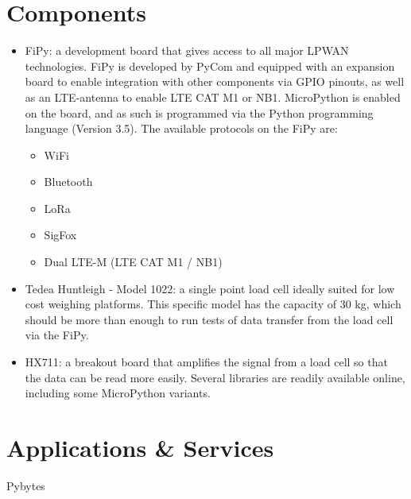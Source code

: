 \iffalse
\begin{itemize}
  \item Have a specific background or spread it out
  \item May be necessary to introduce certain things
\end{itemize}
\fi


\section{Components}
\begin{itemize}
  \item FiPy: a development board that gives access to all major LPWAN technologies. FiPy is developed by PyCom and equipped with an expansion board to enable integration with other components via GPIO pinouts, as well as an LTE-antenna to enable LTE CAT M1 or NB1. MicroPython is enabled on the board, and as such is programmed via the Python programming language (Version 3.5). The available protocols on the FiPy are:
  \begin{itemize}
    \item WiFi
    \item Bluetooth
    \item LoRa
    \item SigFox
    \item Dual LTE-M (LTE CAT M1 / NB1)
  \end{itemize}
  
  \item Tedea Huntleigh - Model 1022: a single point load cell ideally suited for low cost weighing platforms. This specific model has the capacity of 30 kg, which should be more than enough to run tests of data transfer from the load cell via the FiPy.

  \item HX711: a breakout board that amplifies the signal from a load cell so that the data can be read more easily. Several libraries are readily available online, including some MicroPython variants. 
\end{itemize}




\section{Applications \& Services}

Pybytes
